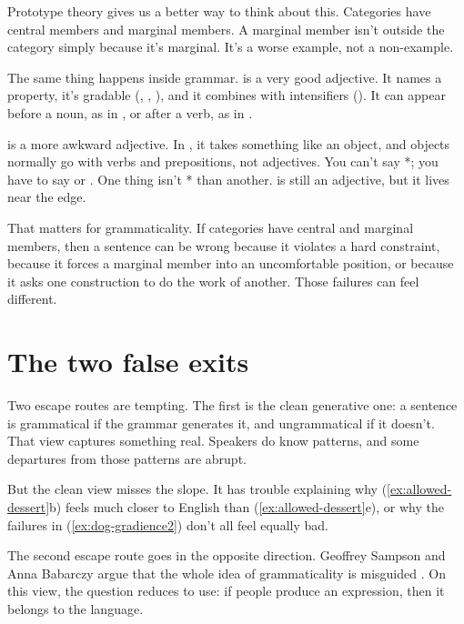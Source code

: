 Prototype theory gives us a better way to think about this. Categories have
central members and marginal members. A marginal member isn't outside the
category simply because it's marginal. It's a worse example, not a
non-example.

The same thing happens inside grammar.  is a very good
adjective. It names a property, it's gradable (,
, ), and it combines with intensifiers
(). It can appear before a noun, as in , or after a verb, as in .

 is a more awkward adjective. In , it takes something like an object, and objects normally go with verbs
and prepositions, not adjectives. You can't say *; you have to say  or .
One thing isn't * than another.  is
still an adjective, but it lives near the edge.

That matters for grammaticality. If categories have central and marginal
members, then a sentence can be wrong because it violates a hard constraint,
because it forces a marginal member into an uncomfortable position, or because
it asks one construction to do the work of another. Those failures can feel
different.

\section{The two false exits}

Two escape routes are tempting. The first is the clean generative one: a
sentence is grammatical if the grammar generates it, and ungrammatical if it
doesn't. That view captures something real. Speakers do know patterns, and
some departures from those patterns are abrupt.

But the clean view misses the slope. It has trouble explaining why
(\ref{ex:allowed-dessert}b) feels much closer to English than
(\ref{ex:allowed-dessert}e), or why the failures in
(\ref{ex:dog-gradience2}) don't all feel equally bad.

The second escape route goes in the opposite direction. Geoffrey Sampson and
Anna Babarczy argue that the whole idea of grammaticality is misguided
\citep{Sampson2014b}. On this view, the question reduces to use: if people
produce an expression, then it belongs to the language.

